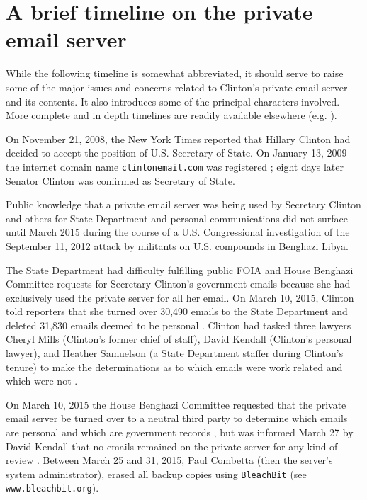 \documentclass[journal]{vgtc}                %
\begin{document}
\section{A brief timeline on the private email server}
\label{sect:Timeline}
While the following timeline is somewhat abbreviated, it should serve to raise some of the major issues and concerns related to Clinton's private email server and its contents.  It also introduces some of the principal characters involved.  More complete and in depth timelines are readily available elsewhere (e.g. \cite{attkissonTimeline, thompsonTimeline, WashPostTimeline, clintonWikipedia, TimeMagEverything}).

On November 21, 2008, the New York Times reported that Hillary Clinton had decided to accept the position of U.S. Secretary of State.  On January 13, 2009 the internet domain name \texttt{clintonemail.com} was registered \cite{whoisClintonserver}; eight days later Senator Clinton was confirmed as Secretary of State.  

Public knowledge that a private email server was being used by Secretary Clinton and others for State Department and personal communications did not surface until March 2015 \cite{NewYorkTimes2015} during the course of a U.S. Congressional investigation \cite{BenghaziReport} of the September 11, 2012 attack by militants on U.S. compounds in Benghazi Libya.  

The State Department had difficulty fulfilling public FOIA and House Benghazi Committee requests \cite{TakingRootWashPost} for Secretary Clinton's government emails because she had exclusively used the private server for all her email.  On March 10, 2015,  Clinton told reporters that she turned over 30,490 emails to the State Department and deleted 31,830 emails deemed to be personal \cite{WashPostTimeline}.    Clinton had tasked three lawyers Cheryl Mills (Clinton's former chief of staff),  David Kendall (Clinton's personal lawyer), and Heather Samuelson (a State Department staffer during Clinton's tenure) to make the determinations as to which emails were work related and which were not \cite{emailVetting, thompsonTimeline}.   

On March 10, 2015 the House Benghazi Committee requested that the private email server be turned over to a neutral third party to determine which emails are personal and which are government records \cite{serverRequest}, but was informed March 27 by David Kendall that no emails remained on the private server for any kind of review \cite{serverScrubbedLawyer}.
Between March 25 and 31, 2015, Paul Combetta (then the server's system administrator), erased all backup copies using \texttt{BleachBit} (see \texttt{www.bleachbit.org}).    
\end{document}

